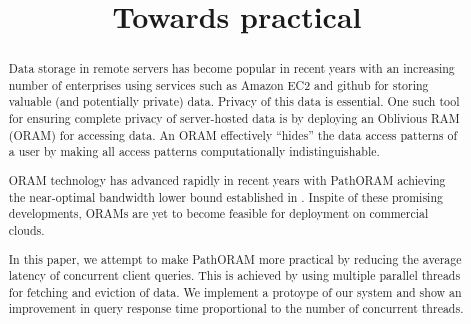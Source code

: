 \documentclass{acm}
\title{Towards practical}
\begin{document}
\begin{abstract}
 Data storage in remote servers has become popular in recent years with an increasing 
 number of enterprises using services such as Amazon EC2 and github for storing 
 valuable (and potentially private) data. Privacy of this data is 
 essential. One such tool for ensuring complete privacy of server-hosted data is by deploying 
 an Oblivious RAM (ORAM) for accessing data. An ORAM effectively ``hides'' the data 
 access patterns of a user by making all access patterns computationally indistinguishable.
 
 ORAM technology has advanced rapidly in recent years \cite{privatefs,binarytreeoram,pathoram,ringoram} with 
 PathORAM \cite{pathoram} achieving the near-optimal bandwidth lower bound established in \cite{goldreich}. 
 Inspite of these promising developments, ORAMs are yet to become feasible for deployment on commercial clouds. 
 
 In this paper, we attempt to make PathORAM \cite{pathoram} more practical by reducing the average latency of 
 concurrent client queries. This is achieved by using multiple parallel threads for 
 fetching and eviction of data. We implement a protoype of our system and show an
 improvement in query response time proportional to the number of concurrent threads.  
 
\end{abstract}





\end{document}

